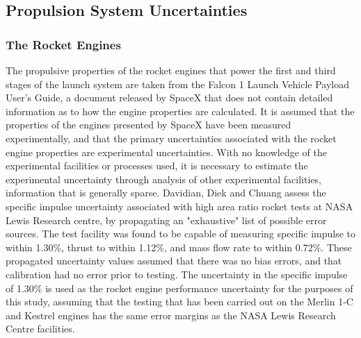 



\subsection{Propulsion System Uncertainties}\label{sec:propunc}




\subsubsection{The Rocket Engines}
The propulsive properties of the rocket engines that power the first and third stages of the launch system are taken from the Falcon 1 Launch Vehicle Payload User's Guide\cite{Vehicle2008}, a document released by SpaceX that does not contain detailed information as to how the engine properties are calculated. It is assumed that the properties of the engines presented by SpaceX have been measured experimentally, and that the primary uncertainties associated with the rocket engine properties are experimental uncertainties. With no knowledge of the experimental facilities or processes used, it is necessary to estimate the experimental uncertainty through analysis of other experimental facilities, information that is generally sparse. Davidian, Diek and Chuang\cite{Davidian1987} assess the specific impulse uncertainty associated with high area ratio rocket tests at NASA Lewis Research centre, by propagating an "exhaustive" list of possible error sources. The test facility was found to be capable of measuring specific impulse to within 1.30\%, thrust to within 1.12\%, and mass flow rate to within 0.72\%. These propagated uncertainty values assumed that there was no bias errors, and that calibration had no error prior to testing. 
The uncertainty in the specific impulse of 1.30\% is used as the rocket engine performance uncertainty for the purposes of this study, assuming that the testing that has been carried out on the Merlin 1-C and Kestrel engines has the same error margins as the NASA Lewis Research Centre facilities. 

